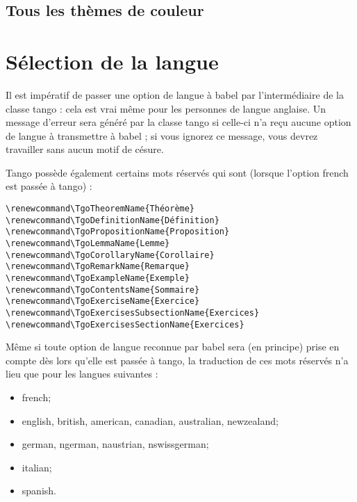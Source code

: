\documentclass[french,ColorTheme=USAF,FontSize=10pt]{tango}
\newcommand\TO[1]{\textsf{#1}}
\begin{document}
\subsection{Tous les thèmes de couleur}
\indent\par
\hspace*{0pt}\hfil{}\hfil{}\hfil{}\hfil{}\hfil%
\hfil\null
\par\bigskip\par
\hspace*{0pt}\hfil{}\hfil{}\hfil{}\hfil{}\hfil{}\hfil\null
\par\bigskip\par
\hspace*{0pt}\hfil{}\hfil{}\hfil{}\hfil{}\hfil{}\hfil\null

\section{Sélection de la langue}\label{lang}
Il est impératif de passer une option de langue à babel par l'intermédiaire de la classe tango : cela est vrai même pour les personnes de langue anglaise. Un message d'erreur sera généré par la classe tango si celle-ci n'a reçu aucune option de langue à transmettre à \TO{babel} ; si vous ignorez ce message, vous devrez travailler sans aucun motif de césure.

Tango possède également certains mots réservés qui sont (lorsque l'option french est passée à tango) :

\begin{tcolorbox}
\begin{verbatim}
\renewcommand\TgoTheoremName{Théorème}
\renewcommand\TgoDefinitionName{Définition}
\renewcommand\TgoPropositionName{Proposition}
\renewcommand\TgoLemmaName{Lemme}
\renewcommand\TgoCorollaryName{Corollaire}
\renewcommand\TgoRemarkName{Remarque}
\renewcommand\TgoExampleName{Exemple}
\renewcommand\TgoContentsName{Sommaire}
\renewcommand\TgoExerciseName{Exercice}
\renewcommand\TgoExercisesSubsectionName{Exercices}
\renewcommand\TgoExercisesSectionName{Exercices}
\end{verbatim}
\end{tcolorbox}

Même si toute option de langue reconnue par babel sera (en principe) prise en compte dès lors qu'elle est passée à tango, la traduction de ces mots réservés n'a lieu que pour les langues suivantes : 
\begin{itemize}
\item\TO{french};
\item\TO{english, british, american, canadian, australian, newzealand};
\item\TO{german, ngerman, naustrian, nswissgerman};
\item\TO{italian};
\item\TO{spanish}.
\end{itemize}
\end{document}
